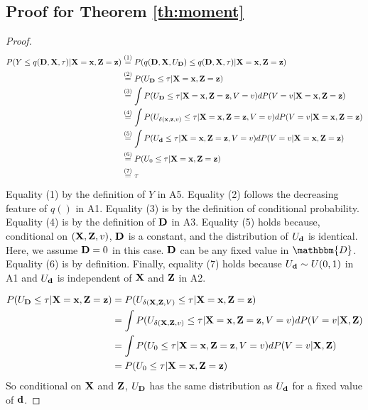 \subsection{Proof for Theorem \ref{th:moment}}	 \label{sec:proof_moment}
\begin{proof}

\begin{align*}
P(Y \leq q(\mathbf{D}, \mathbf{X}, \tau) |\mathbf{X}=\mathbf{x}, \mathbf{Z}=\mathbf{z})
	& \stackrel{(1)}{=} P( q(\mathbf{D}, \mathbf{X}, U_{\mathbf{D}}) \leq q(\mathbf{D}, \mathbf{X}, \tau) |
	\mathbf{X}=\mathbf{x}, \mathbf{Z}=\mathbf{z}) \\
	& \stackrel{(2)}{=} P( U_{\mathbf{D}} \leq \tau | \mathbf{X}=\mathbf{x}, \mathbf{Z}=\mathbf{z}) \\
	& \stackrel{(3)}{=} \int P(U_{\mathbf{D}} \leq \tau | \mathbf{X}=\mathbf{x}, \mathbf{Z}=\mathbf{z}, V=v)
		dP(V=v|\mathbf{X}=\mathbf{x}, \mathbf{Z}=\mathbf{z}) \\
	& \stackrel{(4)}{=} \int P(U_{\delta(\mathbf{x}, \mathbf{z}, v)} \leq \tau
		| \mathbf{X}=\mathbf{x}, \mathbf{Z}=\mathbf{z}, V=v) dP(V=v|\mathbf{X}=\mathbf{x}, \mathbf{Z}=\mathbf{z})  \\
	& \stackrel{(5)}{=} \int P(U_{\mathbf{d}} \leq \tau
		| \mathbf{X}=\mathbf{x}, \mathbf{Z}=\mathbf{z}, V=v) dP(V=v|\mathbf{X}=\mathbf{x}, \mathbf{Z}=\mathbf{z})  \\
	& \stackrel{(6)}{=} P(U_0 \leq \tau | \mathbf{X}=\mathbf{x}, \mathbf{Z}=\mathbf{z}) \\
	& \stackrel{(7)}{=} \tau
\end{align*}
Equality (1) by the definition of $Y$ in A5. Equality (2) follows the decreasing
feature of $q()$ in A1. Equality (3) is by the definition of conditional
probability. Equality (4) is by the definition of $\mathbf{D}$ in A3. Equality (5) holds
because, conditional on $(\mathbf{X}, \mathbf{Z}, v)$, $\mathbf{D}$ is a constant, and the
distribution of $U_{\mathbf{d}}$ is identical. Here, we assume $\mathbf{D} = 0$ in this case.
$\mathbf{D}$ can be any fixed value in $\mathbbm{D}$. Equality (6) is by definition.
Finally, equality (7) holds because $U_{\mathbf{d}} \sim U(0,1)$ in A1 and $U_{\mathbf{d}}$ is
independent of $\mathbf{X}$ and $\mathbf{Z}$ in A2.

\begin{align*}
P(U_{\mathbf{D}} \leq \tau | \mathbf{X}=\mathbf{x}, \mathbf{Z}=\mathbf{z}) &= P(U_{\delta(\mathbf{X}, \mathbf{Z}, V)} \leq \tau |\mathbf{X}
= \mathbf{x}, \mathbf{Z}=\mathbf{z}) \\
	&= \int P(U_{\delta(\mathbf{X}, \mathbf{Z}, v)}\leq \tau |\mathbf{X}=\mathbf{x}, \mathbf{Z}=\mathbf{z}, V=v)
		d P(V=v|\mathbf{X}, \mathbf{Z})  \\
	&= \int P(U_0 \leq \tau | \mathbf{X}=\mathbf{x}, \mathbf{Z}=\mathbf{z}, V=v) d P(V=v | \mathbf{X}, \mathbf{Z}) \\
	&= P(U_0 \leq \tau | \mathbf{X}=\mathbf{x}, \mathbf{Z}=\mathbf{z})
\end{align*}
So conditional on $\mathbf{X}$ and $\mathbf{Z}$, $U_{\mathbf{D}}$ has the same distribution as $U_{\mathbf{d}}$ for
a fixed value of $\mathbf{d}$.

\end{proof}

